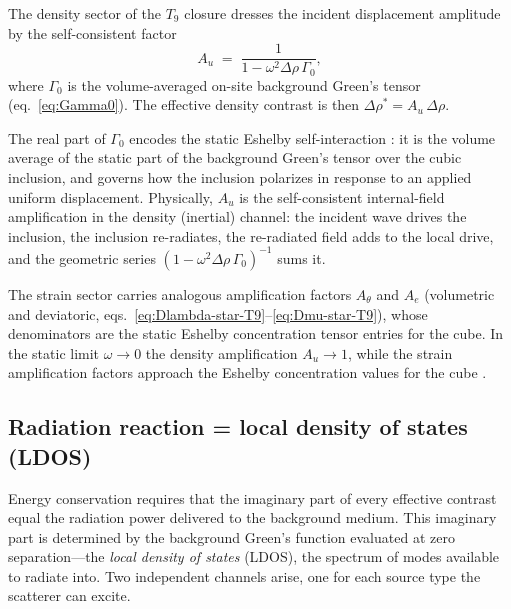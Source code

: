 \documentclass[11pt,a4paper]{article}
\newcommand{\D}{\Delta}
\theoremstyle{plain}
\theoremstyle{definition}
\theoremstyle{remark}
\begin{document}
The density sector of the $T_9$ closure dresses the incident displacement
amplitude by the self-consistent factor
\begin{equation}
  A_u \;=\; \frac{1}{1 - \omega^2\D\rho\,\Gamma_0},
  \label{eq:Au}
\end{equation}
where $\Gamma_0$ is the volume-averaged on-site background Green's tensor
(eq.~\eqref{eq:Gamma0}).  The effective density contrast is then
$\D\rho^* = A_u\,\D\rho$.

The real part of $\Gamma_0$ encodes the static Eshelby self-interaction
\cite{eshelby1957}: it is the volume average of the static part of the
background Green's tensor over the cubic inclusion, and governs how the
inclusion polarizes in response to an applied uniform displacement.
Physically, $A_u$ is the self-consistent internal-field amplification in
the density (inertial) channel: the incident wave drives the inclusion, the
inclusion re-radiates, the re-radiated field adds to the local drive, and the
geometric series $(1 - \omega^2\D\rho\,\Gamma_0)^{-1}$ sums it.

The strain sector carries analogous amplification factors $A_\theta$ and
$A_e$ (volumetric and deviatoric, eqs.~\eqref{eq:Dlambda-star-T9}--\eqref{eq:Dmu-star-T9}),
whose denominators are the static Eshelby concentration tensor entries for
the cube.  In the static limit $\omega \to 0$ the density amplification
$A_u \to 1$, while the strain amplification factors approach the Eshelby
concentration values for the cube \cite{eshelby1957,mura1987}.

\subsection{Radiation reaction = local density of states (LDOS)}
\label{sec:ldos}

Energy conservation requires that the imaginary part of every effective
contrast equal the radiation power delivered to the background medium.
This imaginary part is determined by the background Green's function
evaluated at zero separation---the \emph{local density of states} (LDOS),
the spectrum of modes available to radiate into.  Two independent channels
arise, one for each source type the scatterer can excite.
\end{document}
